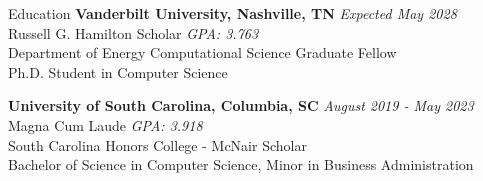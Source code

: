 \documentclass{resume}
\begin{document}


\begin{rSection}{Education}
{\bf Vanderbilt University, Nashville, TN} \hfill {\em Expected May 2028} \\
Russell G. Hamilton Scholar \hfill {\em GPA: 3.763 } \\
Department of Energy Computational Science Graduate Fellow \\
Ph.D. Student in Computer Science

{\bf University of South Carolina, Columbia, SC} \hfill {\em August 2019 - May 2023} \\
Magna Cum Laude \hfill {\em GPA: 3.918 } \\
South Carolina Honors College - McNair Scholar \\
Bachelor of Science in Computer Science, Minor in Business Administration
\end{rSection}

\end{document}
